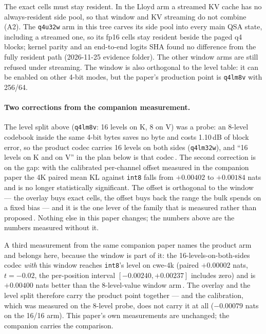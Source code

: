\documentclass[10pt,twocolumn]{article}
\begin{document}
The exact cells must stay resident. In the Lloyd arm a streamed KV cache has no always-resident side pool, so that window and KV streaming do not combine (A2). The \texttt{q4u32w} arm in this tree carves its side pool into every main QSA state, including a streamed one, so its fp16 cells stay resident beside the paged q4 blocks; kernel parity and an end-to-end logits SHA found no difference from the fully resident path (2026-11-25 evidence folder). The other window arms are still refused under streaming. The window is also orthogonal to the level table: it can be enabled on other 4-bit modes, but the paper's production point is \texttt{q4lm8v} with 256/64.

\paragraph{Two corrections from the companion measurement.} The level split above (\texttt{q4lm8v}: 16 levels on K, 8 on V) was a probe: an 8-level codebook inside the same 4-bit bytes saves no byte and costs 1.10\,dB of block error, so the product codec carries 16 levels on both sides (\texttt{q4lm32w}), and ``16 levels on K and on V'' in the plan below is that codec\,\cite{mean-centered}. The second correction is on the gap: with the calibrated per-channel offset measured in the companion paper the 4K paired mean KL against \texttt{int8} falls from $+0.00402$ to $+0.00184$ nats and is no longer statistically significant. The offset is orthogonal to the window --- the overlay buys exact cells, the offset buys back the range the bulk spends on a fixed bias --- and it is the one lever of the family that is measured rather than proposed\,\cite{mean-centered}. Nothing else in this paper changes; the numbers above are the numbers measured without it.

A third measurement from the same companion paper names the product arm and belongs here, because the window is part of it: the 16-levels-on-both-sides codec \emph{with} this window reaches \texttt{int8}'s level on cwe-4k (paired $+0.00002$ nats, $t = -0.02$, the per-position interval $[-0.00240, +0.00237]$ includes zero) and is $+0.00400$ nats better than the 8-level-value window arm\,\cite{mean-centered}. The overlay and the level split therefore carry the product point together --- and the calibration, which was measured on the 8-level probe, does not carry it at all ($-0.00079$ nats on the 16/16 arm). This paper's own measurements are unchanged; the companion carries the comparison.
\end{document}
